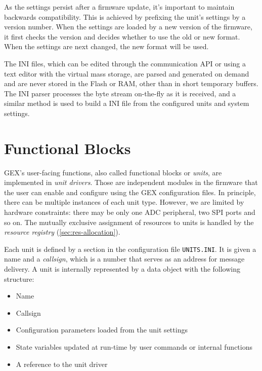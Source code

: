 As the settings persist after a firmware update, it's important to maintain backwards compatibility. This is achieved by prefixing the unit's settings by a version number. When the settings are loaded by a new version of the firmware, it first checks the version and decides whether to use the old or new format. When the settings are next changed, the new format will be used.

The INI files, which can be edited through the communication API or using a text editor with the virtual mass storage, are parsed and generated on demand and are never stored in the Flash or RAM, other than in short temporary buffers. The INI parser processes the byte stream on-the-fly as it is received, and a similar method is used to build a INI file from the configured units and system settings.


\section{Functional Blocks} \label{sec:units-function}

GEX's user-facing functions, also called functional blocks or \textit{units}, are implemented in \textit{unit drivers}. Those are independent modules in the firmware that the user can enable and configure using the GEX configuration files. In principle, there can be multiple instances of each unit type. However, we are limited by hardware constraints: there may be only one ADC peripheral, two SPI ports and so on. The mutually exclusive assignment of resources to units is handled by the \textit{resource registry} (\ref{sec:res-allocation}).

Each unit is defined by a section in the configuration file \verb|UNITS.INI|. It is given a name and a \textit{callsign}, which is a number that serves as an address for message delivery. A unit is internally represented by a data object with the following structure:

\begin{itemize}
	\item Name
	\item Callsign
	\item Configuration parameters loaded from the unit settings
	\item State variables updated at run-time by user commands or internal functions
	\item A reference to the unit driver
\end{itemize}

